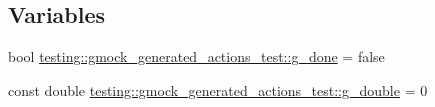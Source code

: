 \subsection*{Variables}
\begin{DoxyCompactItemize}
\item 
bool \hyperlink{namespacetesting_1_1gmock__generated__actions__test_a5f828d39e27f0615498d5aa31c96916e}{testing\+::gmock\+\_\+generated\+\_\+actions\+\_\+test\+::g\+\_\+done} = false
\item 
const double \hyperlink{namespacetesting_1_1gmock__generated__actions__test_aa10d8101300a51dd20ab028fa9971313}{testing\+::gmock\+\_\+generated\+\_\+actions\+\_\+test\+::g\+\_\+double} = 0
\end{DoxyCompactItemize}
